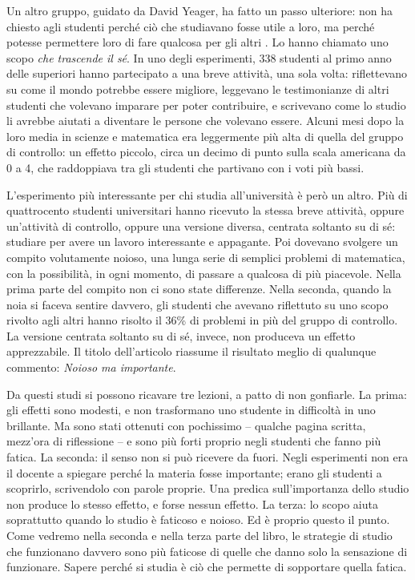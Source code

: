 Un altro gruppo, guidato da David Yeager, ha fatto un passo ulteriore:
non ha chiesto agli studenti perché ciò che studiavano fosse utile a
loro, ma perché potesse permettere loro di fare qualcosa per gli altri
\parencite{yeager2014}. Lo hanno chiamato uno scopo \emph{che trascende
il sé}. In uno degli esperimenti, 338 studenti al primo anno delle
superiori hanno partecipato a una breve attività, una sola volta:
riflettevano su come il mondo potrebbe essere migliore, leggevano le
testimonianze di altri studenti che volevano imparare per poter
contribuire, e scrivevano come lo studio li avrebbe aiutati a diventare
le persone che volevano essere. Alcuni mesi dopo la loro media in
scienze e matematica era leggermente più alta di quella del gruppo di
controllo: un effetto piccolo, circa un decimo di punto sulla scala americana da 0 a 4, che raddoppiava tra
gli studenti che partivano con i voti più bassi.

L'esperimento più interessante per chi studia all'università è però un
altro. Più di quattrocento studenti universitari hanno ricevuto la
stessa breve attività, oppure un'attività di controllo, oppure una
versione diversa, centrata soltanto su di sé: studiare per avere un
lavoro interessante e appagante. Poi dovevano svolgere un compito
volutamente noioso, una lunga serie di semplici problemi di
matematica, con la possibilità, in ogni momento, di passare a qualcosa
di più piacevole. Nella prima parte del compito non ci sono state
differenze. Nella seconda, quando la noia si faceva sentire davvero, gli
studenti che avevano riflettuto su uno scopo rivolto agli altri hanno
risolto il 36\% di problemi in più del gruppo di controllo. La versione
centrata soltanto su di sé, invece, non produceva un effetto
apprezzabile. Il titolo dell'articolo riassume il risultato meglio di
qualunque commento: \emph{Noioso ma importante}.

Da questi studi si possono ricavare tre lezioni, a patto di non
gonfiarle. La prima: gli effetti sono modesti, e non trasformano uno
studente in difficoltà in uno brillante. Ma sono stati ottenuti con
pochissimo -- qualche pagina scritta, mezz'ora di riflessione -- e sono
più forti proprio negli studenti che fanno più fatica. La seconda: il
senso non si può ricevere da fuori. Negli esperimenti non era il docente
a spiegare perché la materia fosse importante; erano gli studenti a
scoprirlo, scrivendolo con parole proprie. Una predica sull'importanza
dello studio non produce lo stesso effetto, e forse nessun effetto. La
terza: lo scopo aiuta soprattutto quando lo studio è faticoso e noioso.
Ed è proprio questo il punto. Come vedremo nella seconda e nella terza
parte del libro, le strategie di studio che funzionano davvero sono più
faticose di quelle che danno solo la sensazione di funzionare. Sapere
perché si studia è ciò che permette di sopportare quella fatica.

